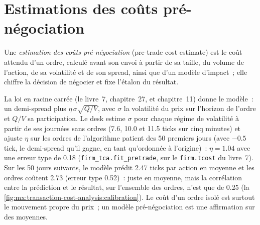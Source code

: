 \section{Estimations des coûts pré-négociation}

\begin{definition}\label{def:mx:transaction-cost-analysis:pretrade}
Une \emph{estimation des coûts pré-négociation} (pre-trade cost estimate) est le coût attendu d'un ordre, calculé avant son envoi à partir de sa taille, du
volume de l'action, de sa volatilité et de son spread, ainsi que d'un modèle d'impact~; elle chiffre la décision de négocier et fixe l'étalon du résultat.
\end{definition}

La loi en racine carrée (le livre~7, chapitre~27, et chapitre~11) donne le modèle~: un demi-spread plus $\eta\,\sigma\sqrt{Q/V}$, avec $\sigma$ la
volatilité du prix sur l'horizon de l'ordre et $Q/V$ sa participation. Le desk estime $\sigma$ pour chaque régime de volatilité à partir de ses journées sans ordres
(7.6, 10.0 et 11.5 ticks sur cinq minutes) et ajuste $\eta$ sur les ordres de l'algorithme patient des 50 premiers jours (avec $-0.5$ tick, le demi-spread
qu'il gagne, en tant qu'ordonnée à l'origine)~: $\eta=1.04$ avec une erreur type de 0.18 (\texttt{firm\_tca.fit\_pretrade}, sur le \texttt{firm.tcost} du livre~7). Sur les
50 jours suivants, le modèle prédit 2.47 ticks par action en moyenne et les ordres coûtent 2.73 (erreur type 0.52)~: juste en moyenne, mais la corrélation
entre la prédiction et le résultat, sur l'ensemble des ordres, n'est que de 0.25 (la \cref{fig:mx:transaction-cost-analysis:calibration}). Le coût d'un ordre isolé est surtout le
mouvement propre du prix~; un modèle pré-négociation est une affirmation sur des moyennes.

\begin{omfigure}

\label{fig:mx:transaction-cost-analysis:calibration}
\end{omfigure}

